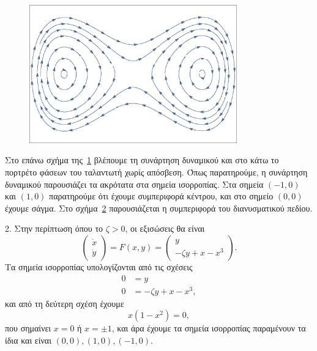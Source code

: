 \begin{solution}
\begin{figure}[h!]
\begin{subfigure}[b]{0.8\textwidth}
        \end{subfigure}
        \caption{}
        \label{fig:ex2_undampedDuffing}
    \end{figure}
    \begin{figure}[h]
        \centering
        \includegraphics[width=0.8\textwidth]{figures/ex2_undampedDuffingVectorField.eps}
        \caption{}
        \label{fig:ex2_undampedDuffingVectorField}
    \end{figure}
    Στο επάνω σχήμα της~\ref{fig:ex2_undampedDuffing} βλέπουμε τη συνάρτηση
    δυναμικού και στο κάτω το πορτρέτο φάσεων του ταλαντωτή  χωρίς
    απόσβεση. Όπως παρατηρούμε, η συνάρτηση δυναμικού παρουσιάζει τα ακρότατα
    στα σημεία ισορροπίας. Στα σημεία \( (-1, 0) \) και \( (1, 0) \) παρατηρούμε
    ότι έχουμε συμπεριφορά κέντρου, και στο σημείο \( (0, 0) \) έχουμε σάγμα.
    Στο σχήμα~\ref{fig:ex2_undampedDuffingVectorField} παρουσιάζεται η
    συμπεριφορά του διανυσματικού πεδίου.

    2. Στην περίπτωση όπου το \( \zeta > 0 \), οι εξισώσεις θα είναι
    \begin{equation*}
        \begin{pmatrix}
            \dot{x} \\
            \dot{y}
        \end{pmatrix} = F(x, y) =
        \begin{pmatrix}
            y \\
            -\zeta y + x - x^3
        \end{pmatrix}.
    \end{equation*}
    Τα σημεία ισορροπίας υπολογίζονται από τις σχέσεις
    \begin{align*}
        0 &= y \\
        0 &= -\zeta y + x - x^3,
    \end{align*}
    και από τη δεύτερη σχέση έχουμε
    \begin{equation*}
        x(1 - x^2) = 0,
    \end{equation*}
    που σημαίνει \( x = 0 \) ή \( x = \pm 1 \), και άρα έχουμε τα σημεία
    ισορροπίας παραμένουν τα ίδια και είναι \( (0, 0), (1, 0), (-1, 0) \).


\end{solution}
